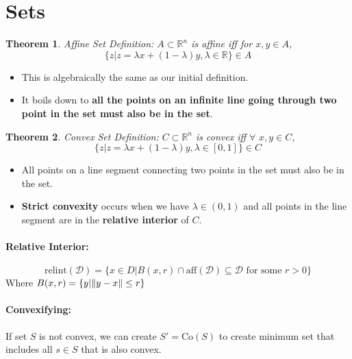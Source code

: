 \documentclass[a4paper,12pt]{report}
\DeclarePairedDelimiter\norm{\lVert}{\rVert}%
\newtheorem{theorem}{Theorem}
\begin{document}
\section{Sets}

\begin{theorem}{Affine Set Definition: }
$A\subset \mathbb R^n$ is affine iff for $x, y\in A$, 
\begin{equation}
\{z | z = \lambda x + (1-\lambda)y, \lambda \in \mathbb R\} \in A
\end{equation}
\end{theorem}
\begin{itemize}
\item This is algebraically the same as our initial definition.
\item It boils down to \textbf{all the points on an infinite line going through two point in the set must also be in the set}. 
\end{itemize}

\begin{theorem}{Convex Set Definition: }
$C\subset \mathbb R^n$ is convex iff $\forall \,\, x, y \in C$, 
\begin{equation}
\{ z | z = \lambda x + (1-\lambda)y, \lambda\in [0,1] \}\in C
\end{equation}
\end{theorem}
\begin{itemize}
\item All points on a line segment connecting two points in the set must also be in the set. 
\item \textbf{Strict convexity} occurs when we have $\lambda \in (0,1)$ and all points in the line segment are in the \textbf{relative interior} of $C$.
\end{itemize}

\paragraph{Relative Interior: } 
\begin{equation}
\text{relint}(\mathcal D) = \{ x\in D | B(x,r) \cap \text{aff}(\mathcal D) \subseteq \mathcal D \text{ for some } r > 0 \}
\end{equation}
Where $B(x,r) = \{y | \norm{y-x} \leq r\}$

\paragraph{Convexifying: } If set $S$ is not convex, we can create $S' = \text{Co}(S)$ to create minimum set that includes all $s\in S$ that is also convex. 
\end{document}
